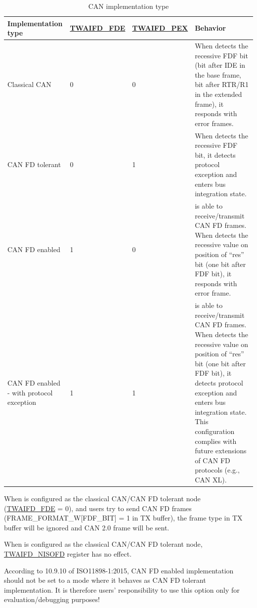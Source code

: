 \documentclass[main\_\_EN.tex]{subfiles}
\begin{document}
\begin{table}[H]
    \centering
    \caption{CAN implementation type}
    \label{tab:twai-func-can-implt-type}
    \begin{tabular}{ |m{2.5cm}|m{1.5cm}|m{1.5cm}|m{9.2cm}| }
    \hline
    \rowcolor{lightgray}
    \textbf{Implementation type} & \textbf{\hyperref[fielddesc:TWAIFDFDE]{TWAIFD\newline \_FDE}} & \textbf{\hyperref[fielddesc:TWAIFDPEX]{TWAIFD\newline \_PEX}} &   \textbf{Behavior} \\\hline

    Classical CAN & 0 & 0 & When \modulename{} detects the recessive FDF bit (bit after IDE in the base frame, bit after RTR/R1 in the extended frame), it responds with error frames.\\\hline
    CAN FD tolerant & 0 & 1 & When \modulename{} detects the recessive FDF bit, it detects protocol exception and enters bus integration state.\\\hline
    CAN FD enabled & 1 & 0 & \modulename{} is able to receive/transmit CAN FD frames. When \modulename{} detects the recessive value on position of ``res'' bit (one bit after FDF bit), it responds with error frame.\\\hline
    CAN FD enabled - with protocol exception & 1 & 1 & \modulename{} is able to receive/transmit CAN FD frames. When \modulename{} detects the recessive value on position of ``res'' bit (one bit after FDF bit), it detects protocol exception and enters bus integration state. This configuration complies with future extensions of CAN FD protocols (e.g., CAN XL).\\\hline
    \end{tabular}
\end{table}

When \modulename{} is configured as the classical CAN/CAN FD tolerant node (\hyperref[fielddesc:TWAIFDFDE]{TWAIFD\_FDE} = 0), and users try to send CAN FD frames (FRAME\_FORMAT\_W[FDF\_BIT] = 1 in TX buffer), the frame type in TX buffer will be ignored and CAN 2.0 frame will be sent.

When \modulename{} is configured as the classical CAN/CAN FD tolerant node, \hyperref[fielddesc:TWAIFDNISOFD]{TWAIFD\_NISOFD} register has no effect.

According to 10.9.10 of ISO11898-1:2015, CAN FD enabled implementation should not be set to a mode where it behaves as CAN FD tolerant implementation. It is therefore users' responsibility to use this option only for evaluation/debugging purposes!
\end{document}
